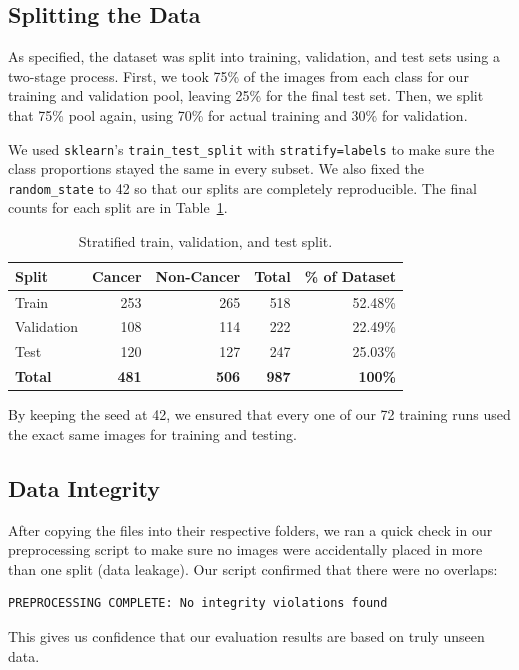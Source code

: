 \subsection{Splitting the Data}

As specified, the dataset was split into training, validation, and test sets using a two-stage process. First, we took 75\% of the images from each class for our training and validation pool, leaving 25\% for the final test set. Then, we split that 75\% pool again, using 70\% for actual training and 30\% for validation.

We used \texttt{sklearn}'s \texttt{train\_test\_split} with \texttt{stratify=labels} to make sure the class proportions stayed the same in every subset. We also fixed the \texttt{random\_state} to 42 so that our splits are completely reproducible. The final counts for each split are in Table~\ref{tab:split}.

\begin{table}[H]
  \centering
  \caption{Stratified train, validation, and test split.}
  \label{tab:split}
  \begin{tabular}{lrrrr}
    \toprule
    \rowcolor{tableheader}
    \textbf{Split} & \textbf{Cancer} & \textbf{Non-Cancer} & \textbf{Total} & \textbf{\% of Dataset} \\
    \midrule
    Train      & 253 & 265 & 518 & 52.48\% \\
    Validation & 108 & 114 & 222 & 22.49\% \\
    Test       & 120 & 127 & 247 & 25.03\% \\
    \midrule
    \textbf{Total} & \textbf{481} & \textbf{506} & \textbf{987} & \textbf{100\%} \\
    \bottomrule
  \end{tabular}
\end{table}

By keeping the seed at 42, we ensured that every one of our 72 training runs used the exact same images for training and testing.

\subsection{Data Integrity}

After copying the files into their respective folders, we ran a quick check in our preprocessing script to make sure no images were accidentally placed in more than one split (data leakage). Our script confirmed that there were no overlaps:

\begin{lstlisting}[style=python, basicstyle=\scriptsize\ttfamily]
PREPROCESSING COMPLETE: No integrity violations found
\end{lstlisting}

This gives us confidence that our evaluation results are based on truly unseen data.

